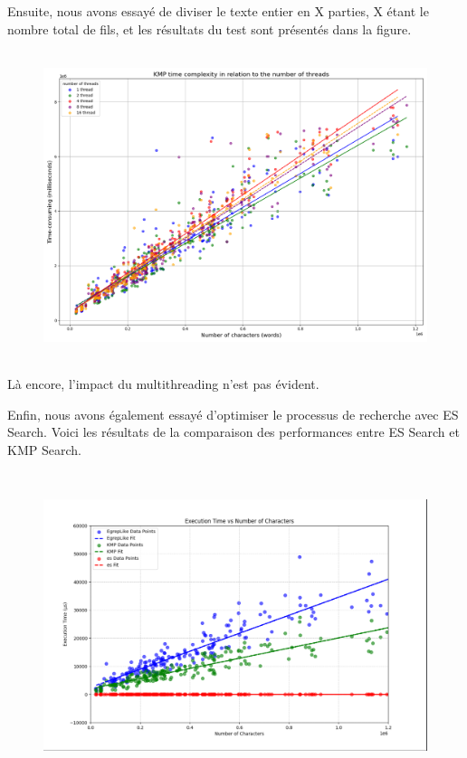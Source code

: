 \documentclass[11pt,english]{article}
\begin{document}
{    \indent Ensuite, nous avons essayé de diviser le texte entier en X parties, X étant le nombre total de fils, et les résultats du test sont présentés dans la figure.

    \begin{figure}[H]
        \begin{center}
            \includegraphics[height=9cm]{./src/KMP_Multi_Part.png}
        \end{center}
    \end{figure}

    \indent Là encore, l'impact du multithreading n'est pas évident.

    \indent Enfin, nous avons également essayé d'optimiser le processus de recherche avec ES Search. Voici les résultats de la comparaison des performances entre ES Search et KMP Search.

    \begin{figure}[H]
        \begin{center}
            \includegraphics[height=9cm]{./src/ES_VS_KMP_2.png}
        \end{center}
    \end{figure}

}
\end{document}
